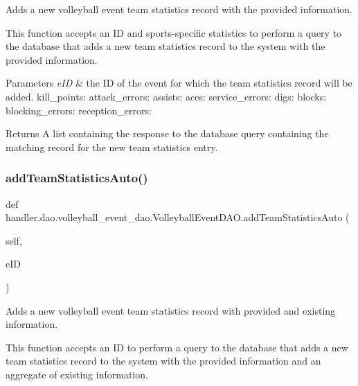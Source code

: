 Adds a new volleyball event team statistics record with the provided information. 

This function accepts an ID and sports-\/specific statistics to perform a query to the database that adds a new team statistics record to the system with the provided information.


\begin{DoxyParams}{Parameters}
{\em e\+ID} & the ID of the event for which the team statistics record will be added. kill\+\_\+points\+: attack\+\_\+errors\+: assists\+: aces\+: service\+\_\+errors\+: digs\+: blocks\+: blocking\+\_\+errors\+: reception\+\_\+errors\+:\\
\hline
\end{DoxyParams}
\begin{DoxyReturn}{Returns}
A list containing the response to the database query containing the matching record for the new team statistics entry. 
\end{DoxyReturn}
\mbox{\label{classhandler_1_1dao_1_1volleyball__event__dao_1_1_volleyball_event_d_a_o_a626826bd1c94f9568e9a493690af2659}} 
\subsubsection{\texorpdfstring{add\+Team\+Statistics\+Auto()}{addTeamStatisticsAuto()}}
{\footnotesize\ttfamily def handler.\+dao.\+volleyball\+\_\+event\+\_\+dao.\+Volleyball\+Event\+D\+A\+O.\+add\+Team\+Statistics\+Auto (\begin{DoxyParamCaption}\item[{}]{self,  }\item[{}]{e\+ID }\end{DoxyParamCaption})}



Adds a new volleyball event team statistics record with provided and existing information. 

This function accepts an ID to perform a query to the database that adds a new team statistics record to the system with the provided information and an aggregate of existing information.


